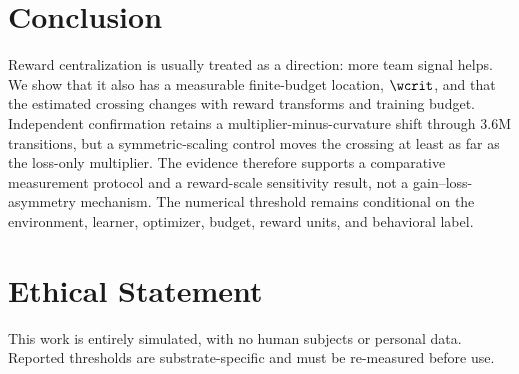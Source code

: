 \section{Conclusion}
\label{sec:conclusion}

Reward centralization is usually treated as a direction: more team signal helps. We show that it also
has a measurable finite-budget location, $\wcrit$, and that the estimated crossing changes with reward
transforms and training budget. Independent confirmation retains a multiplier-minus-curvature shift
through 3.6M transitions, but a symmetric-scaling control moves the crossing at least as far as the
loss-only multiplier. The evidence therefore supports a comparative measurement protocol and a
reward-scale sensitivity result, not a gain--loss-asymmetry mechanism. The numerical threshold remains
conditional on the environment, learner, optimizer, budget, reward units, and behavioral label.

\section*{Ethical Statement}

This work is entirely simulated, with no human subjects or personal data. Reported thresholds are
substrate-specific and must be re-measured before use.

